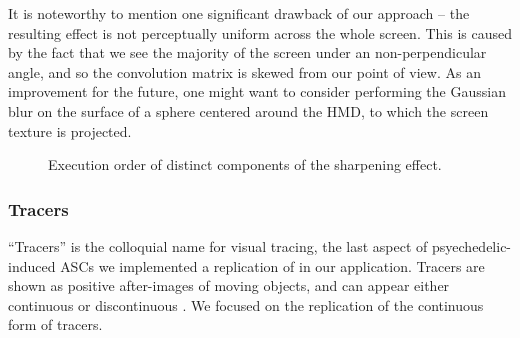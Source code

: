 It is noteworthy to mention one significant drawback of our approach -- the resulting effect is not perceptually uniform across the whole screen. This is caused by the fact that we see the majority of the screen under an non-perpendicular angle, and so the convolution matrix is skewed from our point of view. As an improvement for the future, one might want to consider performing the Gaussian blur on the surface of a sphere centered around the \ac{HMD}, to which the screen texture is projected.

\begin{figure}[H]
    \centering
    \ifgraphics
    \fi
    \caption{Execution order of distinct components of the sharpening effect.}\label{fig:sharpening}
\end{figure}

\subsubsection{Tracers}

``Tracers'' is the colloquial name for visual tracing, the last aspect of psyechedelic-induced \acp{ASC} we implemented a replication of in our application. Tracers are shown as positive after-images of moving objects, and can appear either continuous or discontinuous \autocites{hartman1963effect}{diaz2010sacred}{anderson1972trifluoperazine}{kleinman1977comparison}. We focused on the replication of the continuous form of tracers.

